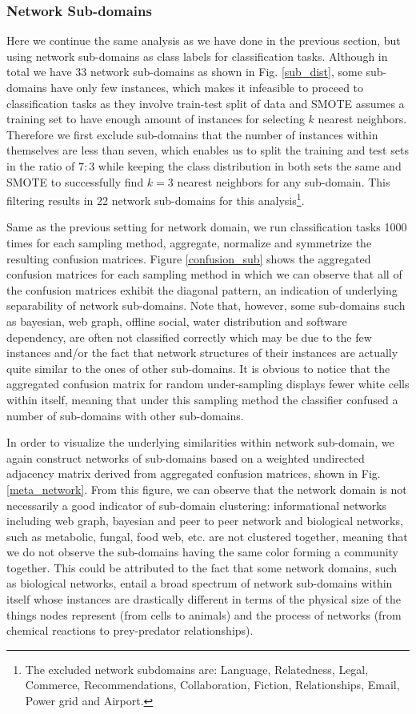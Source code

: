\documentclass[..]{revtex4}
\begin{document}
\subsubsection{Network Sub-domains}
Here we continue the same analysis as we have done in the previous section, but using network sub-domains as class labels for classification tasks.
Although in total we have 33 network sub-domains as shown in Fig. \ref{sub_dist}, some sub-domains have only few instances, which makes it infeasible to proceed to classification tasks as they involve train-test split of data and SMOTE assumes a training set to have enough amount of instances for selecting $k$ nearest neighbors. Therefore we first exclude sub-domains that the number of instances within themselves are less than seven, which enables us to split the training and test sets in the ratio of $7:3$ while keeping the class distribution in both sets the same and SMOTE to successfully find $k=3$ nearest neighbors for any sub-domain. This filtering results in 22 network sub-domains for this analysis\footnote{The excluded network subdomains are: Language, Relatedness, Legal, Commerce, Recommendations, Collaboration, Fiction, Relationships, Email, Power grid and Airport.}. 

Same as the previous setting for network domain, we run classification tasks 1000 times for each sampling method, aggregate, normalize and symmetrize the resulting confusion matrices. Figure \ref{confusion_sub} shows the aggregated confusion matrices for each sampling method in which we can observe that all of the confusion matrices exhibit the diagonal pattern, an indication of underlying separability of network sub-domains. Note that, however, some sub-domains such as bayesian, web graph, offline social, water distribution and software dependency, are often not classified correctly which may be due to the few instances and/or the fact that network structures of their instances are actually quite similar to the ones of other sub-domains. It is obvious to notice that the aggregated confusion matrix for random under-sampling displays fewer white cells within itself, meaning that under this sampling method the classifier confused a number of sub-domains with other sub-domains.

In order to visualize the underlying similarities within network sub-domain, we again construct networks of sub-domains based on a weighted undirected adjacency matrix derived from aggregated confusion matrices, shown in Fig.\ref{meta_network}. From this figure, we can observe that the network domain is not necessarily a good indicator of sub-domain clustering: informational networks including web graph, bayesian and peer to peer network and biological networks, such as metabolic, fungal, food web, etc. are not clustered together, meaning that we do not observe the sub-domains having the same color forming a community together. This could be attributed to the fact that some network domains, such as biological networks, entail a broad spectrum of network sub-domains within itself whose instances are drastically different in terms of the physical size of the things nodes represent (from cells to animals) and the process of networks (from chemical reactions to prey-predator relationships). 
\end{document}
